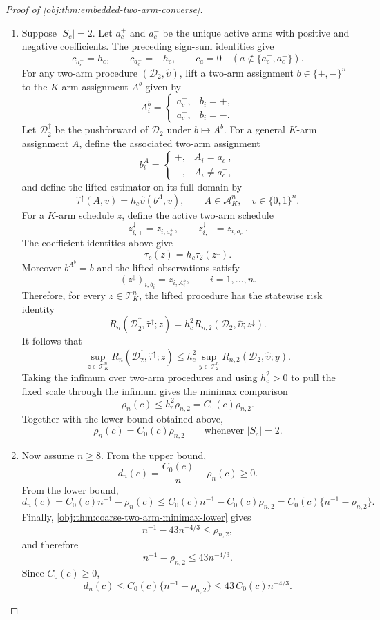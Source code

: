 \begin{proof}[Proof of \cref{obj:thm:embedded-two-arm-converse}]
\begin{enumerate}
\item Suppose \(|S_c|=2\). Let \(a_c^+\) and \(a_c^-\) be the unique active arms with positive and negative coefficients. The preceding sign-sum identities give
\[
c_{a_c^+}=h_c,\qquad c_{a_c^-}=-h_c,
\qquad c_a=0\quad(a\notin\{a_c^+,a_c^-\}).
\]
For any two-arm procedure \((\mathcal D_2,\widehat\upsilon)\), lift a two-arm assignment \(b\in\{+,-\}^n\) to the \(K\)-arm assignment \(A^b\) given by
\[
A^b_i=
\begin{cases}
a_c^+,&b_i=+,\\
a_c^-,&b_i=-.
\end{cases}
\]
Let \(\mathcal D_2^\uparrow\) be the pushforward of \(\mathcal D_2\) under \(b\mapsto A^b\). For a general \(K\)-arm assignment \(A\), define the associated two-arm assignment
\[
b^A_i=
\begin{cases}
+,&A_i=a_c^+,\\
-,&A_i\ne a_c^+,
\end{cases}
\]
and define the lifted estimator on its full domain by
\[
\widehat\tau^\uparrow(A,v)=h_c\widehat\upsilon(b^A,v),
\qquad A\in\mathcal A_K^n,
\quad v\in\{0,1\}^n.
\]
For a \(K\)-arm schedule \(z\), define the active two-arm schedule
\[
z^\downarrow_{i,+}=z_{i,a_c^+},
\qquad
z^\downarrow_{i,-}=z_{i,a_c^-}.
\]
The coefficient identities above give
\[
\tau_c(z)=h_c\tau_2(z^\downarrow).
\]
Moreover \(b^{A^b}=b\) and the lifted observations satisfy
\[
(z^\downarrow)_{i,b_i}=z_{i,A^b_i},
\qquad i=1,\ldots,n.
\]
Therefore, for every \(z\in\mathcal T_K^n\), the lifted procedure has the statewise risk identity
\[
R_n(\mathcal D_2^\uparrow,\widehat\tau^\uparrow;z)
=
h_c^2 R_{n,2}(\mathcal D_2,\widehat\upsilon;z^\downarrow).
\]
It follows that
\[
\sup_{z\in\mathcal T_K^n}R_n(\mathcal D_2^\uparrow,\widehat\tau^\uparrow;z)
\le
h_c^2\sup_{y\in\mathcal T_2^n}R_{n,2}(\mathcal D_2,\widehat\upsilon;y).
\]
Taking the infimum over two-arm procedures and using \(h_c^2>0\) to pull the fixed scale through the infimum gives the minimax comparison
\[
\rho_n(c)
\le
h_c^2\rho_{n,2}
=
C_0(c)\rho_{n,2}.
\]
Together with the lower bound obtained above,
\[
\rho_n(c)=C_0(c)\rho_{n,2}
\qquad\text{whenever } |S_c|=2.
\]

\item Now assume \(n\ge8\). From the upper bound,
\[
d_n(c)=\frac{C_0(c)}{n}-\rho_n(c)\ge0.
\]
From the lower bound,
\[
d_n(c)
=
C_0(c)n^{-1}-\rho_n(c)
\le
C_0(c)n^{-1}-C_0(c)\rho_{n,2}
=
C_0(c)\{n^{-1}-\rho_{n,2}\}.
\]
Finally, \cref{obj:thm:coarse-two-arm-minimax-lower} gives
\[
n^{-1}-43n^{-4/3}\le \rho_{n,2},
\]
and therefore
\[
n^{-1}-\rho_{n,2}\le 43n^{-4/3}.
\]
Since \(C_0(c)\ge0\),
\[
d_n(c)
\le
C_0(c)\{n^{-1}-\rho_{n,2}\}
\le
43\,C_0(c)n^{-4/3}.
\]


\end{enumerate}
\end{proof}
